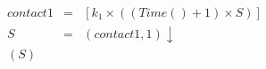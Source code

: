 
\begin{eqnarray*}
\mathit{contact1} & = & [k_1\times ((\mathit{Time}()+1)\times S)]\\
%

%

%

%
S & = & (\mathit{contact1},1){\downarrow}\\
%

%
(S)\end{eqnarray*}
